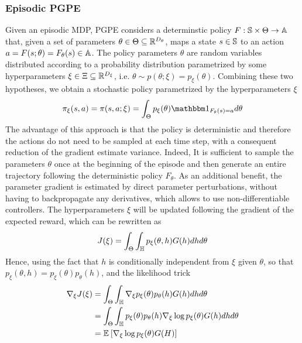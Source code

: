 \subsubsection{Episodic PGPE}
Given an episodic MDP, PGPE considers a determinstic policy $F: \S \times
\Theta \to \A$ that, given a set of parameters $\theta \in \Theta \subseteq
\R^{D_\theta}$, maps a state $s \in \S$ to an action $a = F(s; \theta) =
F_\theta(s) \in \A$. The policy parameters $\theta$ are random variables 
distributed according to a probability distribution parametrized by some 
hyperparameters $\xi \in \Xi \subseteq \R^{D_\xi}$, i.e.  $\theta \sim 
p(\theta; \xi) = p_\xi(\theta)$. Combining these two hypotheses, we obtain a
stochastic policy parametrized by the hyperparameters $\xi$ 
\begin{equation}
	\pi_\xi(s, a) = \pi(s, a; \xi) = \int_\Theta p_\xi(\theta)
	\ind{F_\theta(s) = a} d\theta
\end{equation}
The advantage of this approach is that the policy is deterministic and
therefore the actions do not need to be sampled at each time step, with a
consequent reduction of the gradient estimate variance. Indeed, It is
sufficient to sample the parameters $\theta$ once at the beginning of the
episode and then generate an entire trajectory following the deterministic 
policy $F_\theta$. As an additional benefit, the parameter gradient is
estimated by direct parameter perturbations, without having to backpropagate
any derivatives, which allows to use non-differentiable controllers. The 
hyperparameters $\xi$ will be updated following the gradient of the expected 
reward, which can be rewritten as 
\begin{equation}
	\begin{split}
		J(\xi) &= \int_\Theta \int_\H p_\xi(\theta, h) G(h) dh d\theta\\
	\end{split}
\end{equation}
Hence, using the fact that $h$ is conditionally independent from $\xi$ given
$\theta$, so that $p_\xi(\theta, h) = p_\xi(\theta) p_\theta(h)$, and the 
likelihood trick 
\begin{equation}
	\begin{split}
		\nabla_\xi J(\xi) &= \int_\Theta \int_\H \nabla_\xi p_\xi(\theta) 
						     p_\theta(h) G(h) dh d\theta\\
						  &= \int_\Theta \int_\H p_\xi(\theta) p_\theta(h) 
							 \nabla_\xi \log p_\xi(\theta) G(h) dh d\theta\\
						  &= \E{\nabla_\xi \log p_\xi(\theta) G(H)}
	\end{split}
\end{equation}
